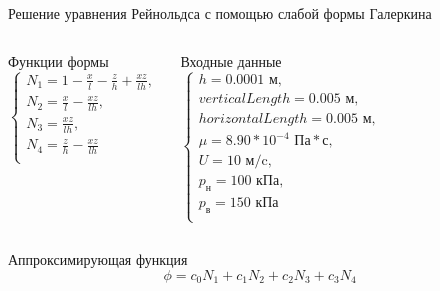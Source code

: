 \documentclass[ignoreonframetext,unicode]{beamer}
\begin{document}
\begin{frame}{Решение уравнения Рейнольдса с помощью слабой формы Галеркина}
	
\begin{columns}
		
	\begin{block}{Функции формы}
		\[
			\begin{cases}
				N_1 = 1 - \frac{x}{l} - \frac{z}{h} + \frac{x  z}{l  h}, \\
				N_2 = \frac{x}{l} - \frac{x  z}{l  h}, \\
				N_3 = \frac{x  z}{l h}, \\
				N_4 = \frac{z}{h} - \frac{x  z}{l  h} \\
			\end{cases}
			\label{form-func}
		\]
		\end{block}
	
	\begin{block}{Входные данные}
	\[
		\begin{cases}
			h = 0.0001 \text{ м}, \\
			verticalLength = 0.005 \text{ м}, \\
			horizontalLength = 0.005 \text{ м}, \\
			\mu = 8.90 * 10^{-4} \text{ Па}*\text{с}, \\
			U = 10 \text{ м/c}, \\
			p_{\text{н}} = 100 \text{ кПа}, \\
			p_{\text{в}} = 150 \text{ кПа} \\
		\end{cases}	
	\]
\end{block}
\end{columns}

\begin{block}{Аппроксимирующая функция}
	\[
	\phi = c_0 N_1 + c_1 N_2 + c_2 N_3 + c_3 N_4
	\]
\end{block}
	
\end{frame}
\end{document}
